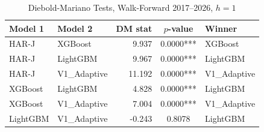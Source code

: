 \begin{table}[htbp]
\centering
\caption{Diebold-Mariano Tests, Walk-Forward 2017--2026, $h=1$}
\label{tab:dm_wf_h1}
\begin{tabular}{llrcl}
\toprule
Model 1 & Model 2 & DM stat & $p$-value & Winner \\
\midrule
HAR-J & XGBoost & 9.937 & 0.0000*** & XGBoost \\
HAR-J & LightGBM & 9.967 & 0.0000*** & LightGBM \\
HAR-J & V1\_Adaptive & 11.192 & 0.0000*** & V1\_Adaptive \\
XGBoost & LightGBM & 4.828 & 0.0000*** & LightGBM \\
XGBoost & V1\_Adaptive & 7.004 & 0.0000*** & V1\_Adaptive \\
LightGBM & V1\_Adaptive & -0.243 & 0.8078 & LightGBM \\
\bottomrule
\end{tabular}
\end{table}